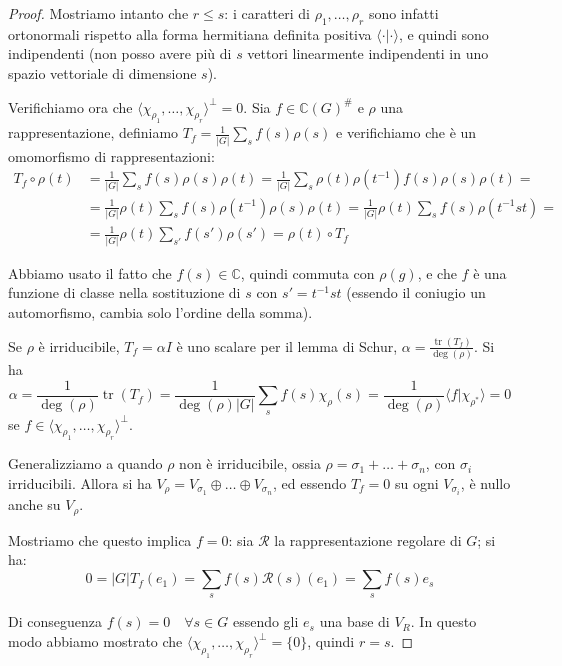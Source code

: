 \documentclass[11pt]{article}
\theoremstyle{plain}
\theoremstyle{definition}
\theoremstyle{remark}
\newcommand{\C}{\mathbb{C}}
\newcommand{\dsum}{\displaystyle\sum}
\DeclareMathOperator{\tr}{tr}
\begin{document}
\begin{proof}

Mostriamo intanto che $r \leq s$: i caratteri di $\rho_1, \ldots , \rho_r$ sono infatti ortonormali rispetto alla forma hermitiana
definita positiva $\langle \cdot | \cdot \rangle$, e quindi sono indipendenti (non posso avere più di $s$ vettori linearmente indipendenti
in uno spazio vettoriale di dimensione $s$).

Verifichiamo ora che $\langle \chi_{\rho_1}, \ldots, \chi_{\rho_r} \rangle ^{\perp} = {0}$. Sia $f \in \C(G)^\#$ e $\rho$ una rappresentazione,
definiamo $T_f= \frac{1}{|G|}\dsum_s f(s)\rho(s)$ e verifichiamo che è un omomorfismo di rappresentazioni:
\begin{align*}
 T_f \circ \rho(t) &= \frac{1}{|G|}\dsum_s f(s)\rho(s) \rho(t) = \frac{1}{|G|}\dsum_s \rho(t) \rho(t^{-1}) f(s)\rho(s) \rho(t) = \\
 &= \frac{1}{|G|}\rho(t) \dsum_s f(s) \rho(t^{-1}) \rho(s) \rho(t) = \frac{1}{|G|}\rho(t) \dsum_s f(s) \rho(t^{-1}st) =  \\
 &= \frac{1}{|G|}\rho(t) \dsum_{s'} f(s') \rho(s')= \rho(t) \circ T_f
\end{align*}

Abbiamo usato il fatto che $f(s)\in \C$, quindi commuta con $\rho(g)$, e che $f$ è una funzione di classe nella
sostituzione di $s$ con $s'= t^{-1}st$ (essendo il coniugio un automorfismo, cambia solo l'ordine della somma).

Se $\rho$ è irriducibile, $T_f= \alpha I$ è uno scalare per il lemma di Schur, $\alpha= \frac{\tr(T_f)}{\deg(\rho)}$.
Si ha $$\alpha =\frac{1}{\deg(\rho)}\tr(T_f)=\frac{1}{\deg(\rho)|G|}\dsum_s f(s) \chi_\rho(s)=
\frac{1}{\deg(\rho)} \langle f | \chi_{\rho^*} \rangle = 0$$ se $f \in \langle \chi_{\rho_1}, \ldots, \chi_{\rho_r} \rangle ^{\perp}$.

Generalizziamo a quando $\rho$ non è irriducibile, ossia $\rho = \sigma_1+ \ldots + \sigma_n$, con $\sigma_i$ irriducibili. Allora
si ha $V_\rho = V_{\sigma_1}  \oplus \ldots \oplus V_{\sigma_n}$, ed essendo $T_f=0 $ su ogni $V_{\sigma_i}$, è nullo anche su $V_\rho$.

Mostriamo che questo implica $f=0$: sia $\mathcal{R}$ la rappresentazione regolare di $G$; si ha:
$$ 0= |G| T_f (e_1) = \dsum_s f(s) \mathcal{R}(s)(e_1) = \dsum_s f(s) e_s $$

Di conseguenza $f(s)=0 \quad \forall s \in G$ essendo gli $e_s$ una base di $V_R$.
In questo modo abbiamo mostrato che $\langle \chi_{\rho_1}, \ldots, \chi_{\rho_r} \rangle ^{\perp} = \{0\}$, quindi $r=s$.
\end{proof}
\end{document}
